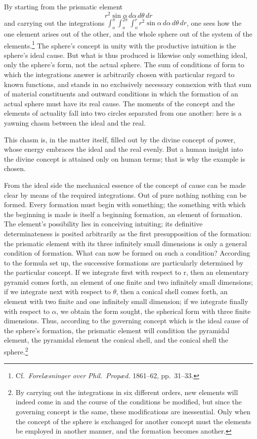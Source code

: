 \documentclass[12pt,a4paper]{book}
\begin{document}
By starting from the prismatic element
\[ r^{2}\sin\alpha\, d\alpha\, d\theta\, dr \]
and carrying out the integrations $\int_{o}^{\pi}\int_{o}^{2\pi}\int_{o}^{r}
r^{2}\sin\alpha\, d\alpha\, d\theta\, dr$, one sees how the one element arises out of the other,
and the whole sphere out of the system of the elements.\footnote{%
Cf.\ \textit{Forelæsninger over Phil.\ Propæd.} 1861--62, pp.\ 31--33.}
The sphere's
concept in unity with the productive intuition is the sphere's ideal cause. But what is thus
produced is likewise only something ideal, only the sphere's form, not the actual sphere. The
sum of conditions of form to which the integrations answer is arbitrarily chosen with particular
regard to known functions, and stands in no exclusively necessary connexion with that sum of
material constituents and outward conditions in which the formation of an actual sphere must
have its real cause. The moments of the concept and the elements of actuality fall into two
circles separated from one another: here is a yawning chasm between the ideal and the real.

This chasm is, in the matter itself, filled out by the divine concept of power, whose energy
embraces the ideal and the real evenly. But a human insight into the divine concept is attained
only on human terms; that is why the example is chosen.

From the ideal side the mechanical essence of the concept of cause can be made clear by means of
the required integrations. Out of pure nothing nothing can be formed. Every formation must begin
with something; the something with which the beginning is made is itself a beginning formation,
an element of formation. The element's possibility lies in conceiving intuiting; its definitive
determinateness is posited arbitrarily as the first presupposition of the formation: the
prismatic element with its three infinitely small dimensions is only a general condition of
formation. What can now be formed on such a condition? According to the formula set up, the
successive formations are particularly determined by the particular concept. If we integrate
first with respect to r, then an elementary pyramid comes forth, an element of one finite and
two infinitely small dimensions; if we integrate next with respect to $\theta$, then a conical
shell comes forth, an element with two finite and one infinitely small dimension; if we
integrate finally with respect to $\alpha$,
we obtain the form sought, the spherical form with three finite dimensions. Thus, according to
the governing concept which is the ideal cause of the sphere's formation, the prismatic element
will condition the pyramidal element, the pyramidal element the conical shell, and the conical
shell the sphere.\footnote{%
By carrying out the integrations in six different orders, new elements will indeed come in and
the course of the conditions be modified, but since the governing concept is the same, these
modifications are inessential. Only when the concept of the sphere is exchanged for another
concept must the elements be employed in another manner, and the formation becomes another.}
\end{document}
